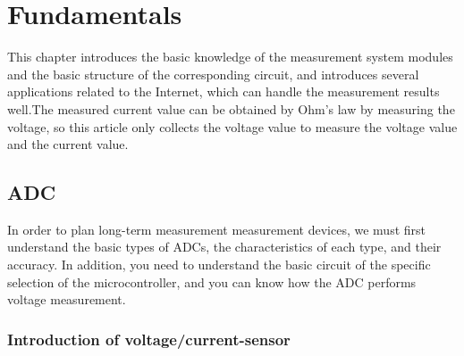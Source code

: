 \chapter{Fundamentals}
\label{chap:Fundamentals}
This chapter introduces the basic knowledge of the measurement system modules and the basic structure of the corresponding circuit, and introduces several applications related to the Internet, which can handle the measurement results well.The measured current value can be obtained by Ohm's law by measuring the voltage, so this article only collects the voltage value to measure the voltage value and the current value.
\section{ADC}
\label{sec:ADC}
In order to plan long-term measurement measurement devices, we must first understand the basic types of ADCs, the characteristics of each type, and their accuracy. In addition, you need to understand the basic circuit of the specific selection of the microcontroller, and you can know how the ADC performs voltage measurement.

\subsection{Introduction of voltage/current-sensor}
\label{sec:Introduction of voltage/current-sensor}



